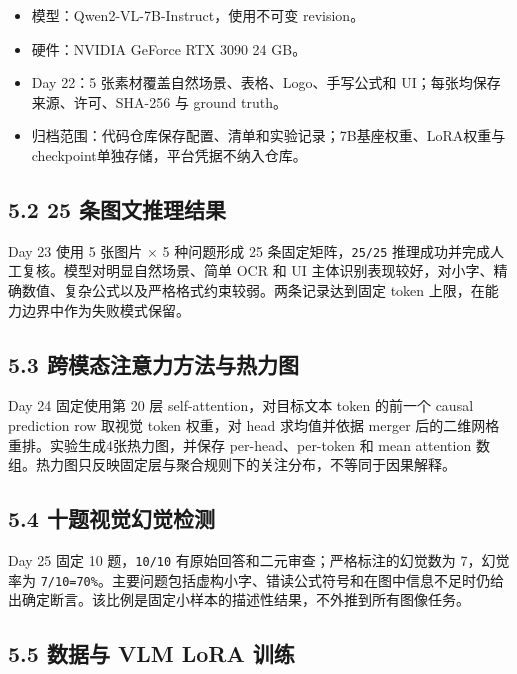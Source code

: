 \documentclass[UTF8,fontset=fandol,a4paper,11pt]{ctexart}
\providecommand{\tightlist}{\setlength{\itemsep}{0pt}\setlength{\parskip}{0pt}}
\begin{document}
\begin{itemize}
\tightlist
\item
  模型：Qwen2-VL-7B-Instruct，使用不可变 revision。
\item
  硬件：NVIDIA GeForce RTX 3090 24 GB。
\item
  Day 22：5 张素材覆盖自然场景、表格、Logo、手写公式和
  UI；每张均保存来源、许可、SHA-256 与 ground truth。
\item
  归档范围：代码仓库保存配置、清单和实验记录；7B基座权重、LoRA权重与checkpoint单独存储，平台凭据不纳入仓库。
\end{itemize}

\subsection{5.2 25 条图文推理结果}\label{ux6761ux56feux6587ux63a8ux7406ux7ed3ux679c}

Day 23 使用 5 张图片 × 5 种问题形成 25 {条固定矩阵，\nolinkurl{25/25}}
推理成功并完成人工复核。模型对明显自然场景、简单 OCR 和 UI
主体识别表现较好，对小字、精确数值、复杂公式以及严格格式约束较弱。两条记录达到固定
token 上限，在能力边界中作为失败模式保留。

\subsection{5.3 跨模态注意力方法与热力图}\label{ux8de8ux6a21ux6001ux6ce8ux610fux529bux65b9ux6cd5ux4e0eux70edux529bux56fe}

Day 24 固定使用第 20 层 self-attention，对目标文本 token 的前一个 causal
prediction row 取视觉 token 权重，对 head 求均值并依据 merger
后的二维网格重排。实验生成4张热力图，并保存 per-head、per-token 和 mean
attention
数组。热力图只反映固定层与聚合规则下的关注分布，不等同于因果解释。

\subsection{5.4 十题视觉幻觉检测}\label{ux5341ux9898ux89c6ux89c9ux5e7bux89c9ux68c0ux6d4b}

Day 25 固定 10 {题，\nolinkurl{10/10}}
有原始回答和二元审查；严格标注的幻觉数为 7，幻觉率为
\nolinkurl{7/10=70%}。主要问题包括虚构小字、错读公式符号和在图中信息不足时仍给出确定断言。该比例是固定小样本的描述性结果，不外推到所有图像任务。

\subsection{5.5 数据与 VLM LoRA 训练}\label{ux6570ux636eux4e0e-vlm-lora-ux8badux7ec3}
\end{document}
